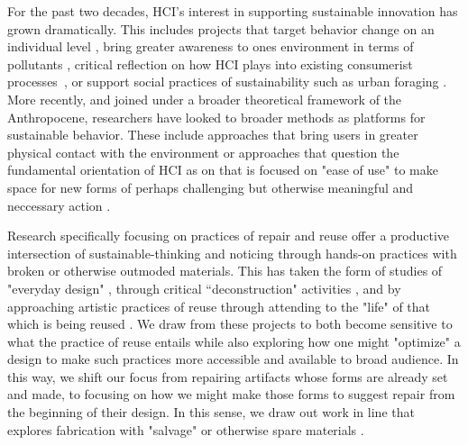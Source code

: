 For the past two decades, HCI's interest in supporting sustainable innovation has grown dramatically. This includes projects that target behavior change on an individual level \cite{disalvo_mapping_2010, dourish_hci_2010}, bring greater awareness to ones environment in terms of pollutants \cite{kim_wearair:_2010, da_costa_interspecies_nodate, aoki_vehicle_2009}, critical reflection on how HCI plays into existing consumerist processes~\cite{blevis_sustainable_2007, pan_fashion_2014,raghavan_means_2017}, or support social practices of sustainability such as urban foraging \cite{disalvo_fruit_2017}. More recently, and joined under a broader theoretical framework of the Anthropocene, researchers have looked to broader methods as platforms for sustainable behavior. These include approaches that bring users in greater physical contact with the environment \cite{liu_design_2018, kuznetsov_nurturing_2011, light_design_2017} or approaches that question the fundamental orientation of HCI as on that is focused on "ease of use" \cite{light_design_2017} to make space for new forms of perhaps challenging but otherwise meaningful and neccessary action \cite{devendorf_hci-amusement_2019, Dew:2018:MWL:3232617.3232626, Dew:2019:DWS:3322276.3322320}.

Research specifically focusing on practices of repair and reuse \cite{jackson_repair_2012, Dew:2019:DWS:3322276.3322320, Dew:2018:LWC:3173574.3174159, Wyche_postcolonialphone, Wakkary_greendesignfiction, Tsaknaki_thingsfallapart} offer a productive intersection of sustainable-thinking and noticing through hands-on practices with broken or otherwise outmoded materials. This has taken the form of studies of "everyday design" \cite{Wakkary:2009:SIC:1518701.1518761, Maestri:2011:URC:2069618.2069633}, through critical ``deconstruction" activities \cite{Murer:2018:MTA:3196709.3196806, Murer:2015:DID:2882850.2882860, Murer:2017:UDE:3024969.3024993}
, and by approaching artistic practices of reuse through attending to the "life" of that which is being reused \cite{jackson_breakdown_2014}. We draw from these projects to both become sensitive to what the practice of reuse entails while also exploring how one might "optimize" a design to make such practices more accessible and available to broad audience. In this way, we shift our focus from repairing artifacts whose forms are already set and made, to focusing on how we might make those forms to suggest repair from the beginning of their design. In this sense, we draw out work in line that explores fabrication with "salvage" \cite{Dew:2019:DWS:3322276.3322320} or otherwise spare materials \cite{devendorf_being_2015,KovacsTrussFormer}. 

